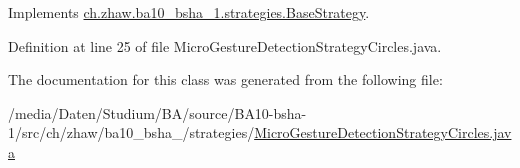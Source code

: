 Implements \hyperlink{classch_1_1zhaw_1_1ba10__bsha__1_1_1strategies_1_1BaseStrategy_af6ea27835befac71906915236a347450}{ch.zhaw.ba10\_\-bsha\_\-1.strategies.BaseStrategy}.

Definition at line 25 of file MicroGestureDetectionStrategyCircles.java.

The documentation for this class was generated from the following file:\begin{DoxyCompactItemize}
\item 
/media/Daten/Studium/BA/source/BA10-\/bsha-\/1/src/ch/zhaw/ba10\_\-bsha\_/strategies/\hyperlink{MicroGestureDetectionStrategyCircles_8java}{MicroGestureDetectionStrategyCircles.java}\end{DoxyCompactItemize}

